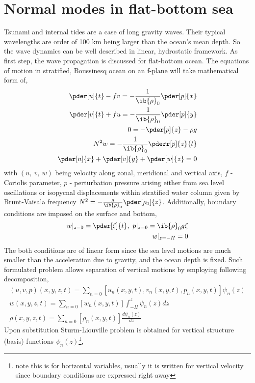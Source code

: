 \documentclass[12pt]{article}
\begin{document}
\section{Normal modes in flat-bottom sea}
Tsunami and internal tides are a case of long gravity waves. Their typical wavelengths are order of 
100 km being larger than the ocean's mean depth. So the wave dynamics can be well described in 
linear, hydrostatic framework. As first step, the wave propagation is discussed for flat-bottom 
ocean. The equations of motion in stratified, Boussinesq ocean on an f-plane 
\citep{kundu2008fluid, cushman2011introduction} will take mathematical form of,
\begin{align}
\label{In:Beq}
\pder[u]{t} - f v = -\frac{1}{\ib{\rho}_0}\pder[p]{x}\\
\pder[v]{t} + f u = -\frac{1}{\ib{\rho}_0}\pder[p]{y}\\
0 = -\pder[p]{z} - \rho g\\
N^2 w = -\frac{1}{\ib{\rho}_0} \pderr[p]{z}{t}\\
\pder[u]{x} + \pder[v]{y} + \pder[w]{z} = 0
\end{align}
with $(u,~v,~w)$ being velocity along zonal, meridional and vertical axis, $f$ - Coriolis parameter, $p$ - perturbation pressure arising either from sea level oscillations or isopycnal displacements within stratified water column given by Brunt-Vaisala frequency $N^2 = -\frac{g}{\ib{\rho}_0}\pder[\rho_0]{z}$. Additionally, boundary conditions are imposed on the surface and bottom,
\begin{align}
w|_{z = 0} = \pder[\zeta]{t},~p|_{z = 0} = \ib{\rho}_0 g \zeta\\
w|_{z = -H} = 0\label{In:bc.swe}
\end{align}
The both conditions are of linear form since the sea level motions are much smaller than the 
acceleration due to gravity, and the ocean depth is fixed. Such formulated problem allows 
separation of vertical motions by employing following decomposition,
\begin{align}
(u, v, p)(x,y,z,t) = \sum_{n = 0} [u_n(x,y,t), v_n(x,y,t), p_n(x,y,t)]\psi_n(z)\\
w(x,y,z,t) = \sum_{n = 0} [w_n(x,y,t)] \int_{-H}^z \psi_n(z) dz\\
\rho(x,y,z,t) = \sum_{n = 0} [\rho_n(x,y,t)] \frac{d \psi_n(z)}{dz}
\end{align}
Upon substitution Sturm-Liouville problem is obtained for vertical structure (basis) functions 
$\psi_n(z)$\footnote{note this is for horizontal variables, usually it is written for vertical 
velocity since boundary conditions are expressed right away},
\end{document}
